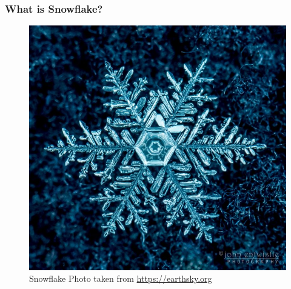 \begin{frame}
	\frametitle{What is Snowflake?}
	\begin{figure}
	\includegraphics[scale=0.25]{Ch01-Introduction-data-management/12-Data-Model/04-Data-Model-Schema-Types/Figures/snowflake-real.jpg}
	\caption{Snowflake Photo taken from  \href{https://earthsky.org/earth/best-snowflakes-photos-from-earthsky-friends}{https://earthsky.org}}
	\end{figure}
\end{frame}
